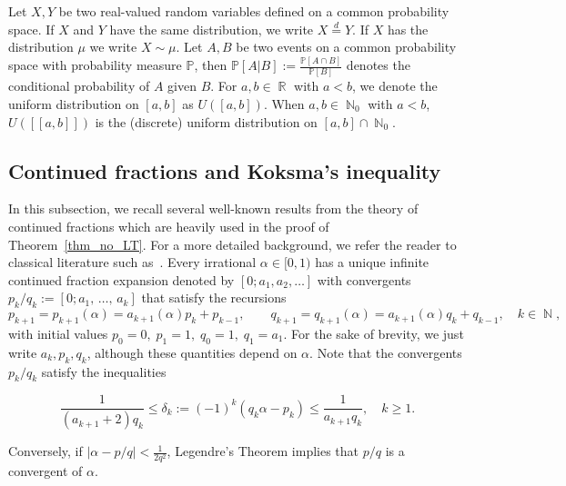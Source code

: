 \documentclass[10pt,a4paper]{amsart}
\numberwithin{equation}{section}
\DeclareMathOperator{\R}{\mathbb{R}}
\DeclareMathOperator{\N}{\mathbb{N}}
\newcommand{\bbP}{\mathbb{P}}
\theoremstyle{definition}
\begin{document}
Let $X,Y$ be two real-valued random variables defined on a common probability space. If $X$ and $Y$ have the same distribution, we write $X \stackrel{d}{=} Y$. If $X$ has the distribution $\mu$ we write $X \sim \mu$. Let $A,B$ be two events on a common probability space with probability measure $\bbP$, then $\bbP [A|B] := \frac{ \bbP[A \cap B]}{\bbP [B]} $ denotes the conditional probability of $A$ given $B$. For $a,b \in \R$ with $a<b$, we denote the uniform distribution on $[a,b]$ as $U([a,b])$. When $a,b \in \N_0$ with $a < b$, $U([\![a,b]\!])$ is the (discrete) uniform distribution on $[a,b] \cap \N_0$.

\subsection*{Continued fractions and Koksma's inequality}\label{cf_prop}


In this subsection, we recall several well-known results from the theory of continued fractions which are heavily used in the proof of Theorem~\ref{thm_no_LT}. For a more detailed background, we refer the reader to classical literature such as~\cite{all_shall,rock_sz}. Every irrational $\alpha \in [0,1)$ has a unique infinite continued fraction expansion denoted by $[0;a_1,a_2,\dots]$ with convergents $p_k/q_k := [0;a_1,\,\dots,\,a_k]$ that satisfy the recursions
\begin{equation*}
p_{k+1} = p_{k+1}(\alpha) = a_{k+1}(\alpha) p_k + p_{k-1}, \qquad q_{k+1} = q_{k+1}(\alpha) = a_{k+1}(\alpha) q_k + q_{k-1}, \quad k \in \N,
\end{equation*}
with initial values $p_0 = 0,\; p_1 = 1,\; q_0 = 1,\; q_1 = a_1$. For the sake of brevity, we just write $a_k, p_k, q_k$, although these quantities depend on $\alpha$. Note that the convergents $p_k/q_k$ satisfy the inequalities

\begin{equation}\label{Eq_parity_deltak}
\frac{1}{(a_{k+1} +2)q_{k}} \leq \delta_k := (-1)^k (q_k \alpha - p_k) \leq
\frac{1}{a_{k+1}q_k}, \quad k \geq 1.
\end{equation}

Conversely, if $| \alpha - p/q| < \frac{1}{2q^2}$, Legendre's Theorem implies that $p/q$ is a convergent of $\alpha$.
\end{document}
